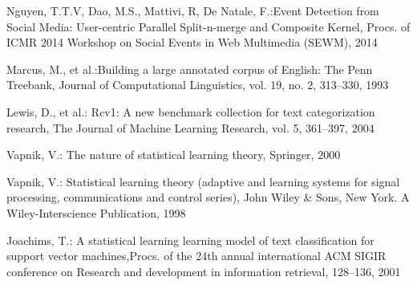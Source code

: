 \documentclass{llncs}
\begin{document}
\begin{thebibliography}{}
Nguyen, T.T.V, Dao, M.S., Mattivi, R, De Natale, F.:Event Detection from Social Media: User-centric Parallel Split-n-merge and Composite Kernel,
Procs. of ICMR 2014 Workshop on Social Events in Web Multimedia (SEWM), 2014

Marcus, M., et al.:Building a large annotated corpus of English: The Penn Treebank, Journal of Computational Linguistics, vol. 19, no. 2, 313--330, 1993

Lewis, D., et al.: Rcv1: A new benchmark collection for text categorization research, The Journal of Machine Learning Research, vol. 5, 361--397, 2004

Vapnik, V.: 
The nature of statistical learning theory, Springer, 2000

Vapnik, V.: Statistical learning theory (adaptive and learning systems for signal processing, communications and control series), 
John Wiley \& Sons, New York. A Wiley-Interscience Publication, 1998

Joachims, T.: 
A statistical learning learning model of text classification for support vector machines,Procs. of the 24th annual international ACM SIGIR conference on Research and development in information retrieval, 128--136, 2001

\end{thebibliography}
\end{document}

